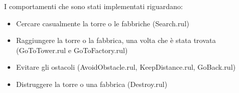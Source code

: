 I comportamenti che sono stati implementati riguardano:
\begin{itemize}
 \item Cercare casualmente la torre o le fabbriche (Search.rul)
 \item Raggiungere la torre o la fabbrica, una volta che è stata trovata (GoToTower.rul e GoToFactory.rul)
 \item Evitare gli ostacoli (AvoidObstacle.rul, KeepDistance.rul, GoBack.rul)
 \item Distruggere la torre o una fabbrica (Destroy.rul)
\end{itemize}
